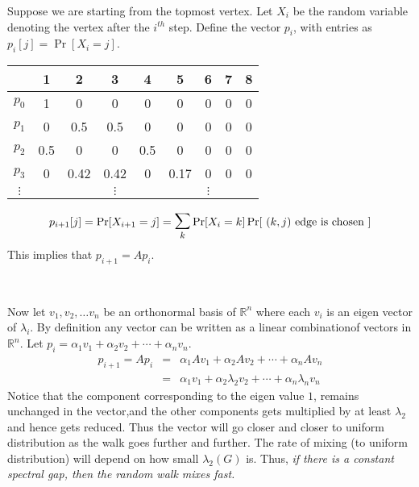 Suppose we are starting from the topmost vertex. Let $X_i$ be the random variable denoting the vertex after the $i^{th}$ step. Define the vector $p_i$, with entries as $p_i[j] = \Pr[X_{i} = j]$.
\hspace{-6mm}\begin{minipage}{0.75\linewidth}
\begin{center}
\begin{tabular}{c|cccccccc}
& 1 & 2 & 3 & 4 & 5 & 6 & 7 & 8 \\
\hline
$p_0$ & 1   & 0    & 0    & 0   & 0 & 0 & 0 & 0 \\
$p_1$ & 0   & 0.5  & 0.5  & 0   & 0 & 0 & 0 & 0 \\
$p_2$ & 0.5 & 0    & 0    & 0.5 & 0 & 0 & 0 & 0 \\
$p_3$ & 0   & 0.42 & 0.42 & 0   & 0.17 & 0 & 0 & 0 \\
$\vdots$ &   &  & $\vdots$ &    & & $\vdots$ & & \\
\end{tabular}
\end{center}
$$p_{i+1}[j] = \Pr[X_{i+1} = j] = \bigsum_k \Pr[X_{i} = k]\Pr[\textrm{ $(k,j)$ edge is chosen }] $$
This implies that $p_{i+1} = Ap_i$. 
\end{minipage}
\begin{minipage}{0.05\linewidth}
~
\end{minipage}
\begin{minipage}{0.15\linewidth}

\GraphInit[vstyle=Classic]
\SetUpVertex[FillColor=blue!60]  
\end{minipage}

\vspace{3mm}
Now let $v_1, v_2, \ldots v_n$  be an orthonormal basis of $\mathbb{R}^n$ where each $v_i$ is an eigen vector of $\lambda_i$. By definition any vector can be written as a linear combinationof vectors in $\mathbb{R}^n$.
Let $p_i = \alpha_1v_1+\alpha_2v_2+\cdots+\alpha_nv_n$.
\begin{eqnarray*}
p_{i+1} = Ap_i & = & \alpha_1 Av_1 + \alpha_2Av_2+\cdots+\alpha_nAv_n \\
& = & \alpha_1v_1 + \alpha_2\lambda_2v_2+\cdots+\alpha_n\lambda_nv_n
\end{eqnarray*}
Notice that the component corresponding to the eigen value $1$, remains unchanged in the vector,and the other components gets multiplied by at least $\lambda_2$ and hence gets reduced. Thus the vector will go closer and closer to uniform distribution as the walk goes further and further. The rate of mixing (to uniform distribution) will depend on how small $\lambda_2(G)$ is. Thus, \textit{if there is a constant spectral gap, then the random walk mixes fast.} 

